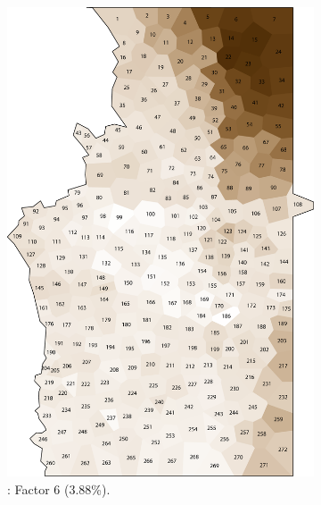 \documentclass[output=paper]{LSP/langsci}
\begin{document}
\begin{figure}
\begin{subfigure}[t]{0.3\textwidth}
\includegraphics[width=\textwidth]{illustrations/pickl_fig7}
\caption{: Factor 6 (3.88\%).}
\label{fig:pickl:7}
\end{subfigure}  
~
\begin{subfigure}[t]{0.3\textwidth}

\end{subfigure}
\end{figure}
\end{document}

